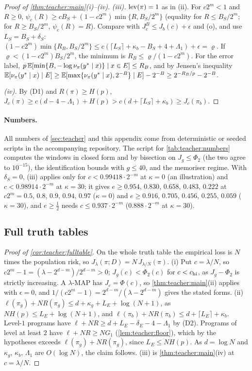 \begin{proof}[Proof of \cref{thm:teacher:main}(i)--(iv)]
\emph{(iii).} $\operatorname{lev}(\pi)=1$ as in (ii). For $c2^m<1$ and $R\ge0$, $\psi_c(R)\ge cB_S+(1-c2^m)\min\{R,B_S/2^m\}$ (equality for $R\le B_S/2^m$; for $R\ge B_S/2^m$, $\psi_c(R)=R$). Compare with $J^B_c\le J_b(c)+\epsilon$ and (o), and use $L_S=B_S+\delta_S$: $(1-c2^m)\min\{R_B,B_S/2^m\}\le c(\lceil L_S\rceil+\kappa_b-B_S+4+\Lambda_1)+\epsilon=\varrho$. If $\varrho<(1-c2^m)B_S/2^m$, the minimum is $R_B\le\varrho/(1-c2^m)$. For the error label, $p\,\mathbb{E}[\min\{B,-\log\nu_\pi(y^*\mid x)\}\mid x\in E]\le R_B$, and by Jensen's inequality $\mathbb{E}[\nu_\pi(y^*\mid x)\mid E]\ge\mathbb{E}[\max\{\nu_\pi(y^*\mid x),2^{-B}\}\mid E]-2^{-B}\ge2^{-R_B/p}-2^{-B}$.

\emph{(iv).} By (D1) and $R(\pi)\ge H(p)$, $J_c(\pi)\ge c(d-4-\Lambda_1)+H(p)>c(d+\lceil L_S\rceil+\kappa_b)\ge J_c(\pi_b)$.
\end{proof}

\paragraph{Numbers.}\label{app:teacher:computations} All numbers of \cref{sec:teacher} and this appendix come from deterministic or seeded scripts in the accompanying repository. The script for \cref{tab:teacher:numbers} computes the windows in closed form and by bisection on $J_g\le\Phi_2$ (the two agree to $10^{-15}$), the identification bounds with $g\le40$, and the memoriser regime. With $\delta_S=0$, (iii) applies only for $c<0.99418\cdot2^{-m}$ at $\kappa=0$ (an illustration) and $c<0.98914\cdot2^{-m}$ at $\kappa=30$; it gives $e\ge0.954$, $0.830$, $0.658$, $0.483$, $0.222$ at $c2^m=0.5$, $0.8$, $0.9$, $0.94$, $0.97$ ($\kappa=0$) and $e\ge0.916$, $0.705$, $0.456$, $0.255$, $0.059$ ($\kappa=30$), and $e\ge\frac12$ needs $c\le0.937\cdot2^{-m}$ ($0.888\cdot2^{-m}$ at $\kappa=30$).

\subsection{Full truth tables}\label{app:teacher:fulltable}

\begin{proof}[Proof of \cref{cor:teacher:fulltable}]
On the whole truth table the empirical loss is $N$ times the population risk, so $J_\lambda(\pi;D)=N\,J_{\lambda/N}(\pi)$.
(i) Put $c=\lambda/N$, so $c2^m-1=(\lambda-2^{d-m})/2^{d-m}>0$; $J_g(c)<\Phi_2(c)$ for $c<c_{\rm hi}$, as $J_g-\Phi_2$ is strictly increasing. A $\lambda$-MAP has $J_c=\Phi(c)$, so \cref{thm:teacher:main}(ii) applies with $\epsilon=0$, and $1/(c2^m-1)=2^{d-m}/(\lambda-2^{d-m})$ gives the stated forms.
(ii) $\ell(\pi_g)+NR(\pi_g)\le d+\kappa_g+L_E+\log(N+1)$, as $NH(p)\le L_E+\log(N+1)$, and $\ell(\pi_b)+NR(\pi_b)\le d+\lceil L_E\rceil+\kappa_b$. Level-$1$ programs have $\ell+NR\ge d+L_E-\delta_E-4-\Lambda_1$ by (D2). Programs of level at least $2$ have $\ell+NR\ge NG_1$ (\cref{lem:teacher:floor}), which by the hypotheses exceeds $\ell(\pi_g)+NR(\pi_g)$, since $L_E\le NH(p)$. As $d=\log N$ and $\kappa_g$, $\kappa_b$, $\Lambda_1$ are $O(\log N)$, the claim follows.
(iii) is \cref{thm:teacher:main}(iv) at $c=\lambda/N$.
\end{proof}

